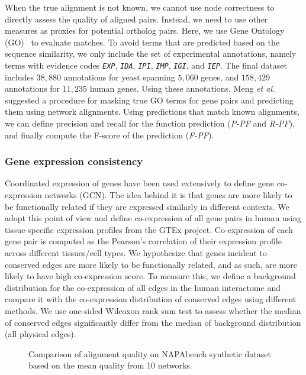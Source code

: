 \documentclass[10pt, journal, compsoc, final]{IEEEtran}
\begin{document}
When the true alignment is not known, we cannot use node correctness to directly assess the 
quality of aligned pairs. Instead, we need to use other measures as proxies for potential ortholog 
pairs. Here, we use Gene Ontology (GO)~\cite{Ashburner2000} to evaluate matches. 
To avoid terms that are predicted based on the sequence similarity, we only include the set of experimental annotations, namely terms with evidence codes \texttt{\textit{EXP}}, \texttt{\textit{IDA}}, \texttt{\textit{IPI}}, \texttt{\textit{IMP}}, 
\texttt{\textit{IGI}}, and \texttt{\textit{IEP}}. The final dataset includes $38,880$ annotations for yeast spanning $5,060$ genes, and 
$158,429$ annotations for $11,235$ human genes. Using these annotations, Meng \textit{et al.} suggested a procedure for masking true GO terms for gene pairs and predicting them using network alignments. Using predictions that match known alignments, we can define precision and recall for the function prediction (\textit{P-PF} and \textit{R-PF}), and finally compute the F-score of the prediction (\textit{F-PF}).


\subsubsection{Gene expression consistency}
Coordinated expression of genes have been used extensively to define gene co-expression networks (GCN). The idea behind it is that genes are more likely to be functionally related if they are expressed similarly in different contexts. We adopt this point of view and define co-expression of all gene pairs in human using tissue-specific expression profiles from the GTEx project. Co-expression of each gene pair is computed as the Pearson's correlation of their expression profile across different tissues/cell types. We hypothesize that genes incident to conserved edges are more likely to be functionally related, and as such, are more likely to have high co-expression score. To measure this, we define a background distribution for the co-expression of all edges in the human interactome and compare it with the co-expression distribution of conserved edges using different methods. We use one-sided Wilcoxon rank sum test to assess whether the median of conserved edges significantly differ from the median of background distribution (all physical edges).


\begin{figure*}[!t]
\centering
\hfil {}\hfil {}\hfil
 \hfil
 \caption{Comparison of alignment quality on NAPAbench synthetic dataset based on  the mean quality from 10 networks.}
 \label{fig:NAPA_validation}
\end{figure*}
\end{document}
